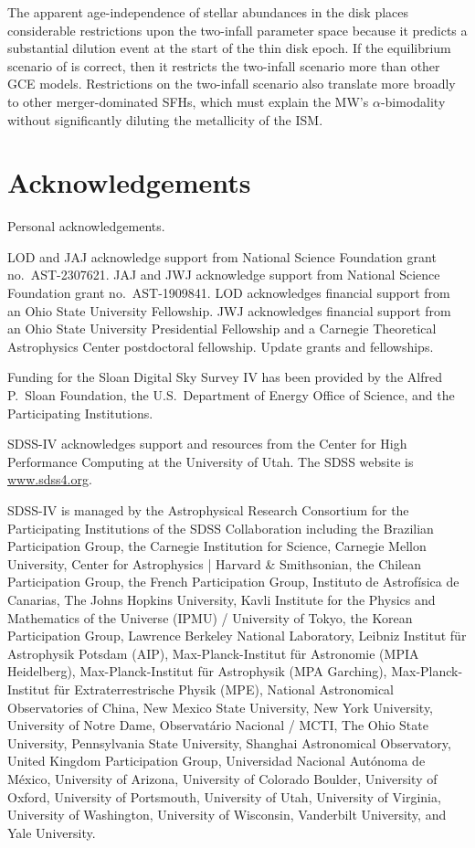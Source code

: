 \documentclass[twocolumn,twocolappendix,linenumbers]{aastex631}
\newcommand{\todo}[1]{{\color{red}#1}}
\begin{document}
The apparent age-independence of stellar abundances in the disk places considerable restrictions upon the two-infall parameter space because it predicts a substantial dilution event at the start of the thin disk epoch. If the equilibrium scenario of \citet{johnson_milky_2024} is correct, then it restricts the two-infall scenario more than other GCE models. Restrictions on the two-infall scenario also translate more broadly to other merger-dominated SFHs, which must explain the MW's $\alpha$-bimodality without significantly diluting the metallicity of the ISM.

\section*{Acknowledgements}

\todo{Personal acknowledgements.}

LOD and JAJ acknowledge support from National Science Foundation grant no.\ AST-2307621. JAJ and JWJ acknowledge support from National Science Foundation grant no.\ AST-1909841.
LOD acknowledges financial support from an Ohio State University Fellowship.
JWJ acknowledges financial support from an Ohio State University Presidential Fellowship and a Carnegie Theoretical Astrophysics Center postdoctoral fellowship. \todo{Update grants and fellowships.}

Funding for the Sloan Digital Sky 
Survey IV has been provided by the 
Alfred P.\ Sloan Foundation, the U.S.\ 
Department of Energy Office of 
Science, and the Participating 
Institutions. 

SDSS-IV acknowledges support and 
resources from the Center for High 
Performance Computing  at the 
University of Utah. The SDSS 
website is \url{www.sdss4.org}.

SDSS-IV is managed by the 
Astrophysical Research Consortium 
for the Participating Institutions 
of the SDSS Collaboration including 
the Brazilian Participation Group, 
the Carnegie Institution for Science, 
Carnegie Mellon University, Center for 
Astrophysics | Harvard \& 
Smithsonian, the Chilean Participation 
Group, the French Participation Group, 
Instituto de Astrof\'isica de 
Canarias, The Johns Hopkins 
University, Kavli Institute for the 
Physics and Mathematics of the 
Universe (IPMU) / University of 
Tokyo, the Korean Participation Group, 
Lawrence Berkeley National Laboratory, 
Leibniz Institut f\"ur Astrophysik 
Potsdam (AIP),  Max-Planck-Institut 
f\"ur Astronomie (MPIA Heidelberg), 
Max-Planck-Institut f\"ur 
Astrophysik (MPA Garching), 
Max-Planck-Institut f\"ur 
Extraterrestrische Physik (MPE), 
National Astronomical Observatories of 
China, New Mexico State University, 
New York University, University of 
Notre Dame, Observat\'ario 
Nacional / MCTI, The Ohio State 
University, Pennsylvania State 
University, Shanghai 
Astronomical Observatory, United 
Kingdom Participation Group, 
Universidad Nacional Aut\'onoma 
de M\'exico, University of Arizona, 
University of Colorado Boulder, 
University of Oxford, University of 
Portsmouth, University of Utah, 
University of Virginia, University 
of Washington, University of 
Wisconsin, Vanderbilt University, 
and Yale University.
\end{document}
